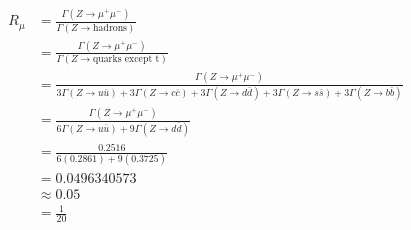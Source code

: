 \begin{align*}
    R_\mu &= \frac{\Gamma(Z \to \mu^+ \mu^-)}{\Gamma(Z \to \text{hadrons})} \\
    &= \frac{\Gamma(Z \to \mu^+ \mu^-)}{\Gamma(Z \to \text{quarks except t})} \\
    &= \frac{\Gamma(Z \to \mu^+ \mu^-)}{3\Gamma(Z \to u\bar{u}) + 3\Gamma(Z \to c\bar{c}) + 3\Gamma(Z \to d\bar{d})+ 3\Gamma(Z \to s\bar{s})+ 3\Gamma(Z \to b\bar{b})} \\
    &= \frac{\Gamma(Z \to \mu^+ \mu^-)}{6\Gamma(Z \to u\bar{u}) + 9\Gamma(Z \to d\bar{d})} \\
    &= \frac{0.2516}{6(0.2861) + 9(0.3725)} \\
    &= 0.0496340573 \\
    &\approx 0.05 \\
    &= \frac{1}{20} \\
\end{align*}
